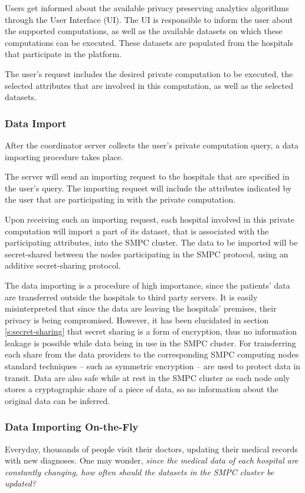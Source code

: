 Users get informed about the available privacy preserving analytics algorithms through the User Interface (UI).
The UI is responsible to inform the user about the supported computations, as well as the available datasets on which these computations can be executed.
These datasets are populated from the hospitals that participate in the platform.

The user's request includes the desired private computation to be executed, the selected attributes that are involved in this computation, as well as the selected datasets.


\subsubsection{Data Import}\label{sss:data-import}
After the coordinator server collects the user's private computation query, a data importing procedure takes place.

The server will send an importing request to the hospitals that are specified in the user's query.
The importing request will include the attributes indicated by the user that are participating in with the private computation.

Upon receiving such an importing request, each hospital involved in this private computation will import a part of its dataset, that is associated with the participating attributes, into the SMPC cluster.
The data to be imported will be secret\hyp shared between the nodes participating in the SMPC protocol, using an additive secret\hyp sharing protocol.

The data importing is a procedure of high importance, since the patients' data are transferred outside the hospitals to third party servers.
It is easily misinterpreted that since the data are leaving the hospitals' premises, their privacy is being compromised.
However, it has been elucidated in section \ref{s:secret-sharing} that secret sharing is a form of encryption, thus no information leakage is possible while data being in use in the SMPC cluster.
For transferring each share from the data providers to the corresponding SMPC computing nodes standard techniques -- such as symmetric encryption -- are used to protect data in transit.
Data are also safe while at rest in the SMPC cluster as each node only stores a cryptographic share of a piece of data, so no information about the original data can be inferred.

\subsubsection{Data Importing On-the-Fly}\label{sss:importing-otf}
Everyday, thousands of people visit their doctors, updating their medical records with new diagnoses.
One may wonder, \textit{since the medical data of each hospital are constantly changing, how often should the datasets in the SMPC cluster be updated?}

